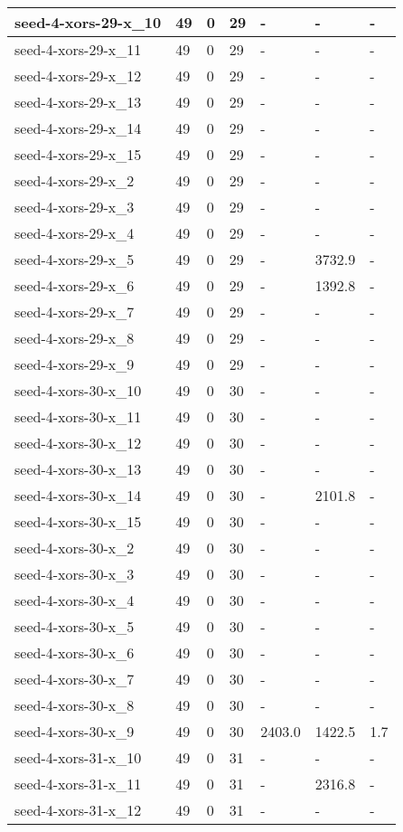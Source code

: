 \begin{scriptsize}
\begin{longtable}{|p{5cm}|l|l|l|l|l|l|}
seed-4-xors-29-x\_10&49&0&29&-&-&- \\ \hline 
seed-4-xors-29-x\_11&49&0&29&-&-&- \\ \hline 
seed-4-xors-29-x\_12&49&0&29&-&-&- \\ \hline 
seed-4-xors-29-x\_13&49&0&29&-&-&- \\ \hline 
seed-4-xors-29-x\_14&49&0&29&-&-&- \\ \hline 
seed-4-xors-29-x\_15&49&0&29&-&-&- \\ \hline 
seed-4-xors-29-x\_2&49&0&29&-&-&- \\ \hline 
seed-4-xors-29-x\_3&49&0&29&-&-&- \\ \hline 
seed-4-xors-29-x\_4&49&0&29&-&-&- \\ \hline 
seed-4-xors-29-x\_5&49&0&29&-&3732.9&- \\ \hline 
seed-4-xors-29-x\_6&49&0&29&-&1392.8&- \\ \hline 
seed-4-xors-29-x\_7&49&0&29&-&-&- \\ \hline 
seed-4-xors-29-x\_8&49&0&29&-&-&- \\ \hline 
seed-4-xors-29-x\_9&49&0&29&-&-&- \\ \hline 
seed-4-xors-30-x\_10&49&0&30&-&-&- \\ \hline 
seed-4-xors-30-x\_11&49&0&30&-&-&- \\ \hline 
seed-4-xors-30-x\_12&49&0&30&-&-&- \\ \hline 
seed-4-xors-30-x\_13&49&0&30&-&-&- \\ \hline 
seed-4-xors-30-x\_14&49&0&30&-&2101.8&- \\ \hline 
seed-4-xors-30-x\_15&49&0&30&-&-&- \\ \hline 
seed-4-xors-30-x\_2&49&0&30&-&-&- \\ \hline 
seed-4-xors-30-x\_3&49&0&30&-&-&- \\ \hline 
seed-4-xors-30-x\_4&49&0&30&-&-&- \\ \hline 
seed-4-xors-30-x\_5&49&0&30&-&-&- \\ \hline 
seed-4-xors-30-x\_6&49&0&30&-&-&- \\ \hline 
seed-4-xors-30-x\_7&49&0&30&-&-&- \\ \hline 
seed-4-xors-30-x\_8&49&0&30&-&-&- \\ \hline 
seed-4-xors-30-x\_9&49&0&30&2403.0&1422.5&1.7 \\ \hline 
seed-4-xors-31-x\_10&49&0&31&-&-&- \\ \hline 
seed-4-xors-31-x\_11&49&0&31&-&2316.8&- \\ \hline 
seed-4-xors-31-x\_12&49&0&31&-&-&- \\ \hline 

\end{longtable}
\end{scriptsize}
